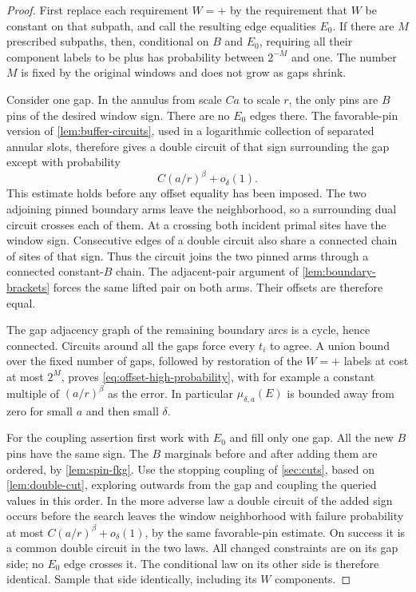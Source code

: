 \begin{proof}
First replace each requirement $W=+$ by the requirement that $W$
be constant on that subpath, and call the resulting edge equalities
$E_0$.  If there are $M$ prescribed subpaths, then, conditional on
$B$ and $E_0$, requiring all their component labels to be plus
has probability between $2^{-M}$ and one.  The number $M$ is
fixed by the original windows and does not grow as gaps shrink.

Consider one gap.  In the annulus from scale $Ca$ to scale $r$,
the only pins are $B$ pins of the desired window sign.  There are
no $E_0$ edges there.  The favorable-pin version of
\cref{lem:buffer-circuits}, used in a logarithmic collection of
separated annular slots, therefore gives a double circuit of
that sign surrounding the gap except with probability
\[
 C(a/r)^\beta+o_\delta(1).
\]
This estimate holds before any offset equality has been imposed.
The two adjoining pinned boundary arms leave the neighborhood,
so a surrounding dual circuit crosses each of them.  At a crossing
both incident primal sites have the window sign.  Consecutive
edges of a double circuit also share a connected chain of sites
of that sign.  Thus the circuit joins the two pinned arms through
a connected constant-$B$ chain.  The adjacent-pair argument of
\cref{lem:boundary-brackets} forces the same lifted pair on both
arms.  Their offsets are therefore equal.

The gap adjacency graph of the remaining boundary arcs is a
cycle, hence connected.  Circuits around all the gaps force every
$t_i$ to agree.  A union bound over the fixed number of gaps,
followed by restoration of the $W=+$ labels at cost at most
$2^M$, proves \eqref{eq:offset-high-probability}, with for
example a constant multiple of $(a/r)^\beta$ as the error.
In particular $\mu_{\delta,a}(E)$ is bounded away from zero for
small $a$ and then small $\delta$.

For the coupling assertion first work with $E_0$ and fill only
one gap.  All the new $B$ pins have the same sign.  The $B$
marginals before and after adding them are ordered, by
\cref{lem:spin-fkg}.  Use the stopping coupling of \cref{sec:cuts}, based on
\cref{lem:double-cut}, exploring outwards from the gap and
coupling the queried values in this order.  In the more adverse
law a double circuit of the added sign occurs before the search
leaves the window neighborhood with failure probability at most
$C(a/r)^\beta+o_\delta(1)$, by the same favorable-pin estimate.
On success it is a common double circuit in the two laws.  All
changed constraints are on its gap side; no $E_0$ edge crosses it.
The conditional law on its other side is therefore identical.
Sample that side identically, including its $W$ components.


\end{proof}
